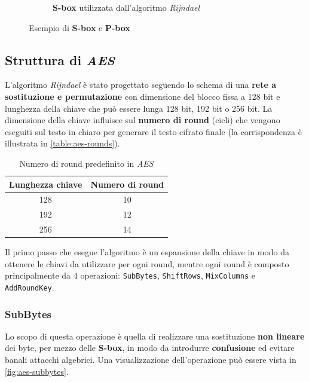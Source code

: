\begin{figure}[h]
\begin{subfigure}{0.48\textwidth}
        \caption{\textbf{S-box} utilizzata dall'algoritmo \emph{Rijndael}}
    \label{fig:aes-s-box}
    \end{subfigure}
    \caption{Esempio di \textbf{S-box} e \textbf{P-box}}
    \label{fig:aes-boxes}
\end{figure}

\subsection{Struttura di \emph{AES}}
L'algoritmo \emph{Rijndael} è stato progettato seguendo lo schema di una \textbf{rete a sostituzione e permutazione} con dimensione del blocco fissa a 128 bit e lunghezza della chiave che può essere lunga 128 bit, 192 bit o 256 bit. La dimensione della chiave influisce sul \textbf{numero di round} (cicli) che vengono eseguiti sul testo in chiaro per generare il testo cifrato finale (la corrispondenza è illustrata in \autoref{table:aes-rounds}).

\begin{table}[h]
    \centering
    \begin{tabular}{| c | c |}
        \hline
        \textbf{Lunghezza chiave} & \textbf{Numero di round} \\
        \hline
        128 & 10 \\
        \hline
        192 & 12 \\
        \hline
        256 & 14 \\
        \hline
    \end{tabular}
    \caption{Numero di round predefinito in \emph{AES}}
    \label{table:aes-rounds}
\end{table}

Il primo passo che esegue l'algoritmo è un espansione della chiave in modo da ottenere le chiavi da utilizzare per ogni round, mentre ogni round è composto principalmente da 4 operazioni: \texttt{SubBytes}, \texttt{ShiftRows}, \texttt{MixColumns} e \texttt{AddRoundKey}.

\subsubsection{SubBytes}
Lo scopo di questa operazione è quella di realizzare una sostituzione \textbf{non lineare} dei byte, per mezzo delle \textbf{S-box}, in modo da introdurre \textbf{confusione} ed evitare banali attacchi algebrici. Una visualizzazione dell'operazione può essere vista in \autoref{fig:aes-subbytes}. \cite{wikipedia_aes}

